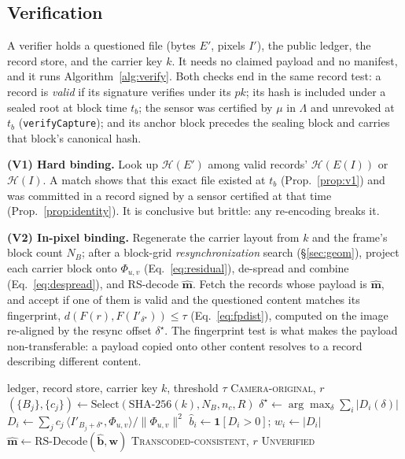 \documentclass[journal]{IEEEtran}
\newcommand{\pr}{\textup{\textsc{PixelRoot}}}
\begin{document}
\subsection{Verification}
A verifier holds a questioned file (bytes $E'$, pixels $I'$), the public ledger,
the record store, and the carrier key $k$. It needs no claimed payload and no
manifest, and it runs Algorithm~\ref{alg:verify}. Both checks end in the same
record test: a record is \emph{valid} if its signature verifies under its
$\mathit{pk}$; its hash is included under a sealed root at block time $t_b$; the
sensor was certified by $\mu$ in $\Lambda$ and unrevoked at $t_b$
(\texttt{verifyCapture}); and its anchor block precedes the sealing block and
carries that block's canonical hash.

\noindent\textbf{(V1) Hard binding.} Look up $\mathcal H(E')$ among valid records'
$\mathcal H(E(I))$ or $\mathcal H(I)$. A match shows that this exact file existed
at $t_b$ (Prop.~\ref{prop:v1}) and was committed in a record signed by a sensor
certified at that time (Prop.~\ref{prop:identity}). It is conclusive but brittle: any
re-encoding breaks it.

\noindent\textbf{(V2) In-pixel binding.} Regenerate the carrier layout from $k$
and the frame's block count $N_B$; after a block-grid \emph{resynchronization} search
(\S\ref{sec:geom}), project each carrier block onto $\Phi_{u,v}$
(Eq.~\ref{eq:residual}), de-spread and combine (Eq.~\ref{eq:despread}), and
RS-decode $\hat{\mathbf{m}}$. Fetch the records whose payload is $\hat{\mathbf{m}}$,
and accept if one of them is valid and the questioned content matches its
fingerprint, $d(F(r),F(I'_{\delta^\star}))\le\tau$ (Eq.~\ref{eq:fpdist}),
computed on the image re-aligned by the resync offset $\delta^\star$. The
fingerprint test is what makes the payload non-transferable: a payload copied
onto other content resolves to a record describing different content.

\begin{algorithm}[t]
\caption{\pr{} verification of a questioned file $(E',I')$}
\label{alg:verify}
\begin{algorithmic}[1]
\REQUIRE ledger, record store, carrier key $k$, threshold $\tau$
  \RETURN \textsc{Camera-original}, $r$
\ENDIF
\STATE $(\{B_j\},\{c_j\})\gets \mathrm{Select}(\mathrm{SHA\text{-}256}(k),N_B,n_c,R)$
\STATE $\delta^\star\gets \arg\max_{\delta}\sum_i |D_i(\delta)|$ 
  \STATE $D_i\gets \sum_{j} c_j\,\langle I'_{B_j+\delta^\star},\Phi_{u,v}\rangle/\|\Phi_{u,v}\|^2$
  \STATE $\hat b_i\gets \mathbf{1}[D_i>0]$;\; $w_i\gets |D_i|$ 
\ENDFOR
\STATE $\hat{\mathbf{m}}\gets \mathrm{RS\text{-}Decode}(\hat{\mathbf{b}},\mathbf{w})$
    \RETURN \textsc{Transcoded-consistent}, $r$
  \ENDIF
\ENDFOR
\RETURN \textsc{Unverified} 
\end{algorithmic}
\end{algorithm}
\end{document}
